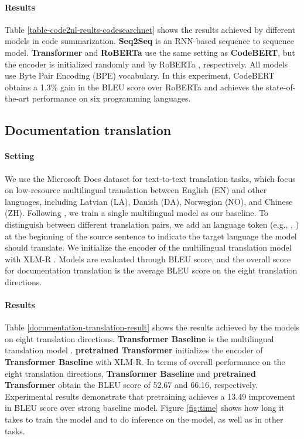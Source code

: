 \documentclass[sigconf,nonacm,screen]{acmart}
\begin{document}
\paragraph{Results} Table \ref{table-code2nl-reults-codesearchnet} shows the results achieved by different models in code summarization. \textbf{Seq2Seq} is an RNN-based sequence to sequence model. \textbf{Transformer} and \textbf{RoBERTa} use the same setting as \textbf{CodeBERT}, but the encoder is initialized randomly and by RoBERTa \cite{liu2019roberta}, respectively. All models use Byte Pair Encoding (BPE) \cite{sennrich2015neural} vocabulary. In this experiment, CodeBERT obtains a 1.3\% gain in the BLEU score over RoBERTa and achieves the state-of-the-art performance on six programming languages. 


\subsection{Documentation translation}
\paragraph{Setting}
We use the Microsoft Docs dataset for text-to-text translation tasks, which focus on low-resource multilingual translation between English (EN) and other languages, including Latvian (LA), Danish (DA), Norwegian (NO), and Chinese (ZH).
Following \citet{johnson2017google}, we train a single multilingual model as our baseline.
To distinguish between different translation pairs, we add an language token (e.g., , ) at the beginning of the source sentence to indicate the target language the model should translate.
We  initialize the encoder of the multilingual translation model with XLM-R \cite{conneau2019unsupervised}.
Models are evaluated through BLEU \cite{papineni2002bleu} score,
and the overall score for documentation translation is the average BLEU score on the eight translation directions. 


\paragraph{Results}
Table \ref{documentation-translation-result} shows the results achieved by the models on eight translation directions.
\textbf{Transformer Baseline} is the multilingual translation model \cite{johnson2017google}.
\textbf{pretrained Transformer} initializes the encoder of \textbf{ Transformer Baseline} with XLM-R\cite{conneau2019unsupervised}.
In terms of overall performance on the eight translation directions, \textbf{Transformer Baseline} and \textbf{pretrained Transformer} obtain the BLEU score of 52.67 and 66.16, respectively.
Experimental results demonstrate that pretraining achieves a 13.49 improvement in BLEU score over strong baseline model. Figure \ref{fig:time} shows how long it takes to train the model and to do inference on the model, as well as in other tasks.
\end{document}
